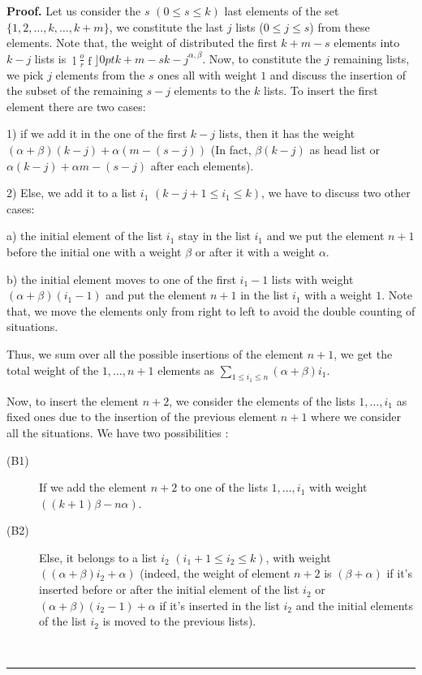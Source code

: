 \documentclass{article}
\newcommand {\lah}[2]{\genfrac\lfloor \rfloor{0pt}{}{#1}{#2}}
\newenvironment{proof}[1][Proof]{\noindent\textbf{#1.} }{\ \rule{0.5em}{0.5em}}
\begin{document}
\begin{proof}
Let us consider the $s$ $(0\leq s \leq k)$ last elements of the set $\{1,2,\ldots ,k,\ldots ,k+m\}$, we
constitute the last $j$ lists ($0\leq j\leq s$) from these elements. Note that,
the weight of distributed the first $k+m-s$ elements into $k-j$ lists is $%
\lah{k+m-s}{k-j}^{\alpha ,\beta }$. Now, to constitute
the $j$ remaining lists, we pick $j$ elements from the $s$ ones all with weight $%
1 $ and discuss the insertion of the subset of the remaining $s-j$ elements to the $k$ lists. To
insert the first element there are two cases:

1) if we add it in the one of the first $k-j$ lists, then it has the weight $\left( \alpha +\beta \right) \left( k-j\right) +\alpha
\left( m-\left( s-j\right) \right) $ (In fact, $\beta \left( k-j\right) $ as head
list or $\alpha \left( k-j\right) +\alpha m-\left( s-j\right) $ after each elements).

2) Else, we add it to a list $i_{1}$ $(k-j+1\leq i_{1}\leq k)$, we have to
discuss two other cases:

a) the initial element of the list $i_{1}$ stay in the list $i_{1}$ and we put the element $n+1$ before the initial one with a weight $\beta $ or after it with a weight $\alpha $.

b) the initial element moves to one of the first $i_{1}-1$ lists with weight $\left( \alpha +\beta \right) (i_{1}-1)$ and put the element $n+1$
in the list $i_{1}$ with a weight $1$. Note that, we move the elements only
from right to left to avoid the double counting of situations.

Thus, we sum over all
the possible insertions of the element $n+1$, we get
the total weight of the $1,\ldots ,n+1$ elements as $\sum_{1\leq i_{1}\leq
n}\left( \alpha +\beta \right) i_{1}$.

Now, to insert the element $n+2$, we consider the elements of the lists $1,\ldots
,i_{1}$ as fixed ones due to the insertion of the previous element $n+1$
where we consider all the situations. We have two possibilities :
\begin{description}
  \item[(B1)] If we add the element $n+2$ to one of the lists $1,\ldots ,i_{1}$ with
weight $\left( \left( k+1\right) \beta -n\alpha \right) $.

  \item[(B2)] Else, it belongs to a list $i_{2}$ $\left( i_{1}+1\leq i_{2}\leq
k\right) $, with weight $\left( \left( \alpha +\beta \right) i_{2}+\alpha
\right) $ (indeed, the weight of element $n+2$ is $\left( \beta +\alpha \right) $ if it's inserted before or after the initial element of the list $i_{2}$ or $\left(\alpha +\beta \right) (i_{2}-1)+\alpha $ if it's inserted in the list $i_{2}$ and the initial
elements of the list $i_{2}$ is moved to the previous lists).
\end{description}


\end{proof}
\end{document}
